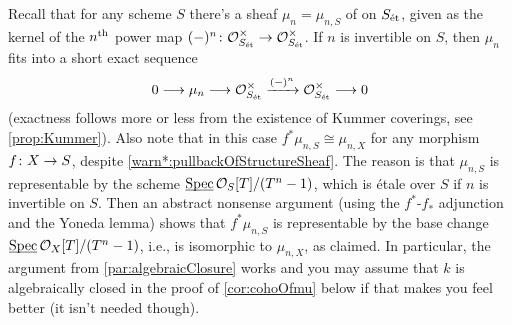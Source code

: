 \numpar{}\label{par:mu}
Recall that for any scheme $S$ there's a sheaf $\mu_n=\mu_{n,S}$ of  on $S_{\mathrm{\acute{e}t}}$, given as the kernel of the $n^{\text{th}}$ power map $(-)^n\colon \Oo_{S_\et}^\times\morphism \Oo_{S_\et}^\times$. If $n$ is invertible on $S$, then $\mu_n$ fits into a short exact sequence
\begin{equation*}
	0\morphism \mu_n\morphism \Oo_{S_\et}^\times\xrightarrow{(-)^n}\Oo_{S_\et}^\times\morphism 0
\end{equation*}
(exactness follows more or less from the existence of Kummer coverings, see \cref{prop:Kummer}). Also note that in this case $f^*\mu_{n,S}\cong \mu_{n,X}$ for any morphism $f\colon X\morphism S$, despite \cref{warn*:pullbackOfStructureSheaf}. The reason is that $\mu_{n,S}$ is representable by the scheme $\operatorname{\underline{\smash{\mathrm{Spec}}}} \mathcal{O}_S[T]/(T^n-1)$, which is étale over $S$ if $n$ is invertible on $S$. Then an abstract nonsense argument (using the $f^*$-$f_*$ adjunction and the Yoneda lemma) shows that $f^*\mu_{n,S}$ is representable by the base change $\operatorname{\underline{\smash{\mathrm{Spec}}}} \mathcal{O}_X[T]/(T^n-1)$, i.e., is isomorphic to $\mu_{n,X}$, as claimed. In particular, the argument from \cref{par:algebraicClosure} works and you may assume that $k$ is algebraically closed in the proof of \cref{cor:cohoOfmu} below if that makes you feel better (it isn't needed though).

